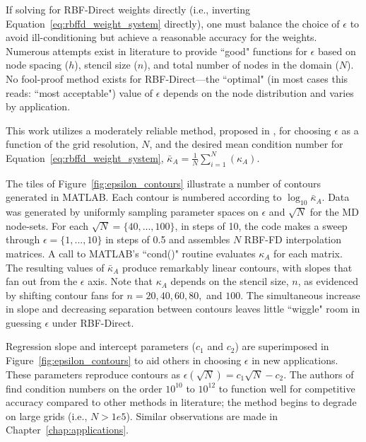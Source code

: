 \documentclass[11pt]{report}
\begin{document}
{If solving for RBF-Direct weights directly (i.e., inverting Equation~\ref{eq:rbffd_weight_system} directly), one must balance the choice of $\epsilon$ to avoid ill-conditioning but achieve a reasonable accuracy for the weights. Numerous attempts exist in literature to provide ``good" functions for $\epsilon$ based on node spacing ($h$), stencil size ($n$), and total number of nodes in the domain ($N$). 
No fool-proof method exists for RBF-Direct---the ``optimal" (in most cases this reads: ``most acceptable") value of $\epsilon$ depends on the node distribution and varies by application. 

This work utilizes a moderately reliable method, proposed in \cite{FlyerLehto11}, for choosing $\epsilon$ as a function of the grid resolution, $N$, and the desired mean condition number for Equation~\ref{eq:rbffd_weight_system}, $\bar{\kappa}_A = \frac{1}{N} \sum_{i=1}^N(\kappa_A)$. %

The tiles of Figure~\ref{fig:epsilon_contours} illustrate a number of contours generated in MATLAB. Each contour is numbered according to $\log_{10}\bar{\kappa}_A$. Data was generated by uniformly sampling parameter spaces on $\epsilon$ and $\sqrt{N}$ for the MD node-sets. For each $\sqrt{N} = \{40, ..., 100\}$, in steps of 10, the code makes a sweep through $\epsilon = \{1, ..., 10\}$ in steps of 0.5 and assembles $N$ RBF-FD interpolation matrices. A call to MATLAB's ``cond()" routine evaluates $\kappa_A$ for each matrix. The resulting values of $\bar{\kappa}_A$ produce remarkably linear contours, with slopes that fan out from the $\epsilon$ axis. Note that $\kappa_A$ depends on the stencil size, $n$, as evidenced by shifting contour fans for $n=20, 40, 60, 80,$ and $100$. The simultaneous increase in slope and decreasing separation between contours leaves little ``wiggle" room in guessing $\epsilon$ under RBF-Direct. 

Regression slope and intercept parameters ($c_1$ and $c_2$) are superimposed in Figure~\ref{fig:epsilon_contours} to aid others in choosing $\epsilon$ in new applications. These parameters reproduce contours as $\epsilon(\sqrt{N}) = c_1 \sqrt{N} - c_2$.  The authors of \cite{FlyerLehto11} find condition numbers on the order $10^{10}$ to $10^{12}$ to function well for competitive accuracy compared to other methods in literature; the method begins to degrade on large grids (i.e., $N > 1e5$). Similar observations are made in Chapter~\ref{chap:applications}. 

}
\end{document}
